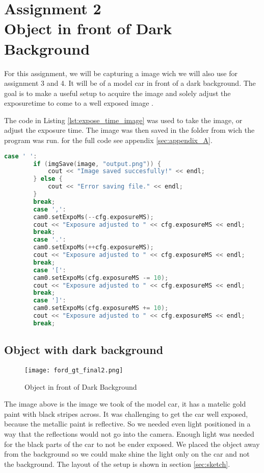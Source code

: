 \section {Assignment 2 \\ {Object in front of Dark Background}}
\label {sec:assignment_2}

For this assignment, we will be capturing a image wich we will also use for assignment 3 and 4. It will be of a model car in front of a dark background. 
The goal is to make a useful setup to acquire the image and solely adjust the exposuretime to come to a well exposed image \cite{Lab_Assignments}.

The code in Listing \ref{lst:expose_time_image} was used to take the image, or adjust the exposure time. The image was then saved in the folder from wich the program was run. for the full code see appendix \ref{sec:appendix_A}.

\begin{lstlisting}[language=C, caption=save image to file, label=lst:expose_time_image]
    case ' ':
        if (imgSave(image, "output.png")) {
            cout << "Image saved succesfully!" << endl;
        } else {
            cout << "Error saving file." << endl;
        }
        break;
        case ',':
        cam0.setExpoMs(--cfg.exposureMS);
        cout << "Exposure adjusted to " << cfg.exposureMS << endl;
        break;
        case '.':
        cam0.setExpoMs(++cfg.exposureMS);
        cout << "Exposure adjusted to " << cfg.exposureMS << endl;
        break;
        case '[':
        cam0.setExpoMs(cfg.exposureMS -= 10);
        cout << "Exposure adjusted to " << cfg.exposureMS << endl;
        break;
        case ']':
        cam0.setExpoMs(cfg.exposureMS += 10);
        cout << "Exposure adjusted to " << cfg.exposureMS << endl;
        break;
\end{lstlisting}

\subsection{Object with dark background}

\begin{figure}[h!]
    \centering
    \texttt{[image: ford\_gt\_final2.png]}
    \caption{Object in front of Dark Background}
    \label{fig:fortgt}
\end{figure}

The image above is the image we took of the model car, it has a matelic gold paint with black stripes across. It was challenging to get the car well exposed, because the metallic paint is reflective. So we needed even light positioned in a way that the reflections would not go into the camera. Enough light was needed for the black parts of the car to not be ender exposed. We placed the object away from the background so we could make shine the light only on the car and not the background. The layout of the setup is shown in section \ref{sec:sketch}.

